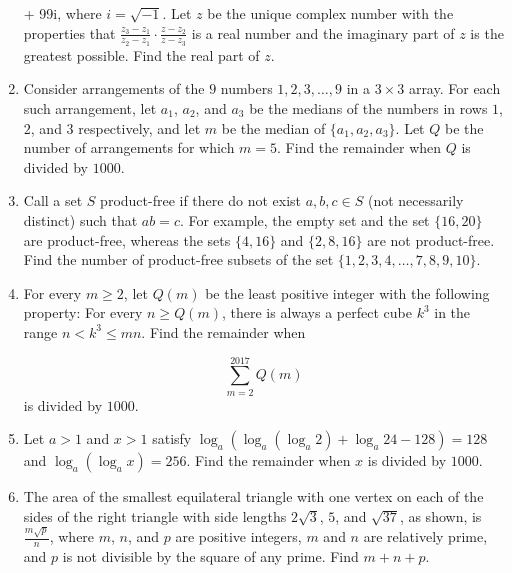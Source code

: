 \documentclass{article}
\begin{document}
\begin{enumerate}[label=\arabic*., itemsep=0.5em]
+ 99i,\) where \(i = \sqrt{-1}\). Let \(z\) be the unique complex number with the properties that \(\frac{z_3 - z_1}{z_2 - z_1} \cdot \frac{z - z_2}{z - z_3}\) is a real number and the imaginary part of \(z\) is the greatest possible. Find the real part of \(z\).\par \vspace{0.5em}\item Consider arrangements of the \(9\) numbers \(1, 2, 3, \dots, 9\) in a \(3 \times 3\) array. For each such arrangement, let \(a_1\), \(a_2\), and \(a_3\) be the medians of the numbers in rows \(1\), \(2\), and \(3\) respectively, and let \(m\) be the median of \(\{a_1, a_2, a_3\}\). Let \(Q\) be the number of arrangements for which \(m = 5\). Find the remainder when \(Q\) is divided by \(1000\).\par \vspace{0.5em}\item Call a set \(S\) product-free if there do not exist \(a, b, c \in S\) (not necessarily distinct) such that \(a b = c\). For example, the empty set and the set \(\{16, 20\}\) are product-free, whereas the sets \(\{4, 16\}\) and \(\{2, 8, 16\}\) are not product-free. Find the number of product-free subsets of the set \(\{1, 2, 3, 4, \ldots, 7, 8, 9, 10\}\).\par \vspace{0.5em}\item For every \(m \geq 2\), let \(Q(m)\) be the least positive integer with the following property: For every \(n \geq Q(m)\), there is always a perfect cube \(k^3\) in the range \(n < k^3 \leq mn\). Find the remainder when

\begin{equation*}
\sum_{m = 2}^{2017} Q(m)
\end{equation*}
is divided by \(1000\).\par \vspace{0.5em}\item Let \(a > 1\) and \(x > 1\) satisfy \(\log_a(\log_a(\log_a 2) + \log_a 24 - 128) = 128\) and \(\log_a(\log_a x) = 256\). Find the remainder when \(x\) is divided by \(1000\).\par \vspace{0.5em}\item The area of the smallest equilateral triangle with one vertex on each of the sides of the right triangle with side lengths \(2\sqrt3\), \(5\), and \(\sqrt{37}\), as shown, is \(\tfrac{m\sqrt{p}}{n}\), where \(m\), \(n\), and \(p\) are positive integers, \(m\) and \(n\) are relatively prime, and \(p\) is not divisible by the square of any prime. Find \(m+n+p\).



\end{enumerate}
\end{document}
